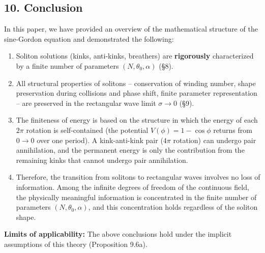 \documentclass[a4paper,11pt]{article}
\begin{document}
\subsection{10. Conclusion}\label{conclusion}

In this paper, we have provided an overview of the mathematical
structure of the sine-Gordon equation and demonstrated the following:

\begin{enumerate}
\def\labelenumi{\arabic{enumi}.}
\item
  Soliton solutions (kinks, anti-kinks, breathers) are
  \textbf{rigorously} characterized by a finite number of parameters
  \((N, \theta_0, \alpha)\) (§8).
\item
  All structural properties of solitons -- conservation of winding
  number, shape preservation during collisions and phase shift, finite
  parameter representation -- are preserved in the rectangular wave
  limit \(\sigma \to 0\) (§9).
\item
  The finiteness of energy is based on the structure in which the energy
  of each \(2\pi\) rotation is self-contained (the potential
  \(V(\phi) = 1-\cos\phi\) returns from \(0 \to 0\) over one period). A
  kink-anti-kink pair (\(4\pi\) rotation) can undergo pair annihilation,
  and the permanent energy is only the contribution from the remaining
  kinks that cannot undergo pair annihilation.
\item
  Therefore, the transition from solitons to rectangular waves involves
  no loss of information. Among the infinite degrees of freedom of the
  continuous field, the physically meaningful information is
  concentrated in the finite number of parameters
  \((N, \theta_0, \alpha)\), and this concentration holds regardless of
  the soliton shape.
\end{enumerate}

\textbf{Limits of applicability:} The above conclusions hold under the
implicit assumptions of this theory (Proposition 9.6a).
\end{document}
